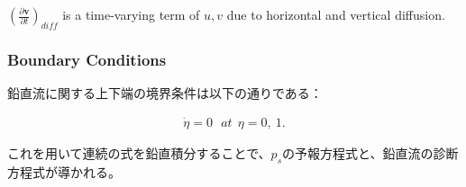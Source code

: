 \(( \frac{\partial {\mathbf{v}}}{\partial t} )_{diff}\) is a
time-varying term of \(u,v\) due to horizontal and vertical diffusion.

\hypertarget{boundary-conditions}{%
\subsubsection{Boundary Conditions}\label{boundary-conditions}}

鉛直流に関する上下端の境界条件は以下の通りである：

\begin{eqnarray}
  \dot{\eta} = 0  \ \ \ at \ \ \eta = 0 , \ 1 .
\end{eqnarray}

これを用いて連続の式を鉛直積分することで、\(p_s\)の予報方程式と、鉛直流の診断方程式が導かれる。

